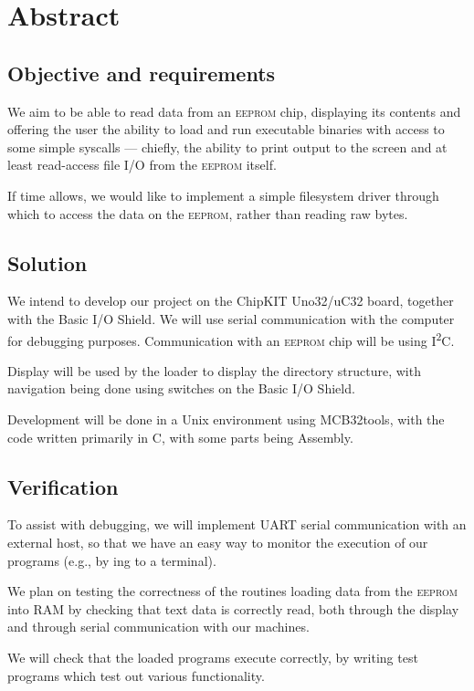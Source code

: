 \documentclass[a4paper, 11pt]{article}
\newcommand*\eeprom{\textsc{eeprom}}
\newcommand*\itwoc{I\textsuperscript{2}C}
\newcommand*\ioshield{Basic I/O Shield}
\begin{document}
\makemytitle

\newpage
\section{Abstract}

\subsection{Objective and requirements}
We aim to be able to read data from an \eeprom{} chip, displaying its contents
and offering the user the ability to load and run executable binaries
with access to some simple syscalls --- chiefly,
the ability to print output to the screen and at least read-access file I/O from the \eeprom{} itself.

If time allows, we would like to implement a simple filesystem driver through which to access the data on the \eeprom{}, rather than reading raw bytes.

\subsection{Solution}
We intend to develop our project on the ChipKIT Uno32/uC32 board, together with the \ioshield{}.
We will use serial communication with the computer for debugging purposes.
Communication with an \eeprom{} chip will be using \itwoc{}.

Display will be used by the loader to display the directory structure,
with navigation being done using switches on the \ioshield{}.

Development will be done in a Unix environment using MCB32tools,
with the code written primarily in C, with some parts being Assembly.

\subsection{Verification}
To assist with debugging, we will implement UART serial communication with an external host,
so that we have an easy way to monitor the execution of our programs
(e.g., by ing to a terminal).

We plan on testing the correctness of the routines loading data from the \eeprom{} into RAM
by checking that text data is correctly read,
both through the display and through serial communication with our machines.

We will check that the loaded programs execute correctly,
by writing test programs which test out various functionality.
\end{document}
